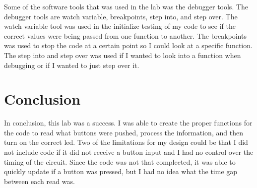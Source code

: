 \documentclass[11pt,a4]{report}
\begin{document}
Some of the software tools that was used in the lab was the debugger tools. The debugger tools are watch variable, breakpoints, step into, and step over. The watch variable tool was used in the initialize testing of my code to see if the correct values were being passed from one function to another. The breakpoints was used to stop the code at a certain point so I could look at a specific function. The step into and step over was used if I wanted to look into a function when debugging or if I wanted to just step over it. 
\section{Conclusion}
In conclusion, this lab was a success. I was able to create the proper functions for the code to read what buttons were pushed, process the information, and then turn on the correct led. Two of the limitations for my design could be that I did not include code if it did not receive a button input and I had no control over the timing of the circuit. Since the code was not that complected, it was able to quickly update if a button was pressed, but I had no idea what the time gap between each read was. 
\end{document}
